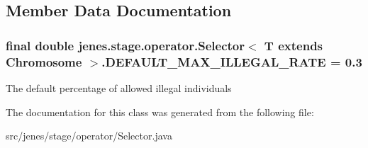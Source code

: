 \subsection{Member Data Documentation}
\hypertarget{classjenes_1_1stage_1_1operator_1_1_selector_3_01_t_01extends_01_chromosome_01_4_81263464a18d2ee1ecddf41f2e97fd89}{
\subsubsection[DEFAULT\_\-MAX\_\-ILLEGAL\_\-RATE]{\setlength{\rightskip}{0pt plus 5cm}final double jenes.stage.operator.Selector$<$ T extends Chromosome $>$.{\bf DEFAULT\_\-MAX\_\-ILLEGAL\_\-RATE} = 0.3}}
\label{classjenes_1_1stage_1_1operator_1_1_selector_3_01_t_01extends_01_chromosome_01_4_81263464a18d2ee1ecddf41f2e97fd89}


The default percentage of allowed illegal individuals 

The documentation for this class was generated from the following file:\begin{CompactItemize}
\item 
src/jenes/stage/operator/Selector.java\end{CompactItemize}
